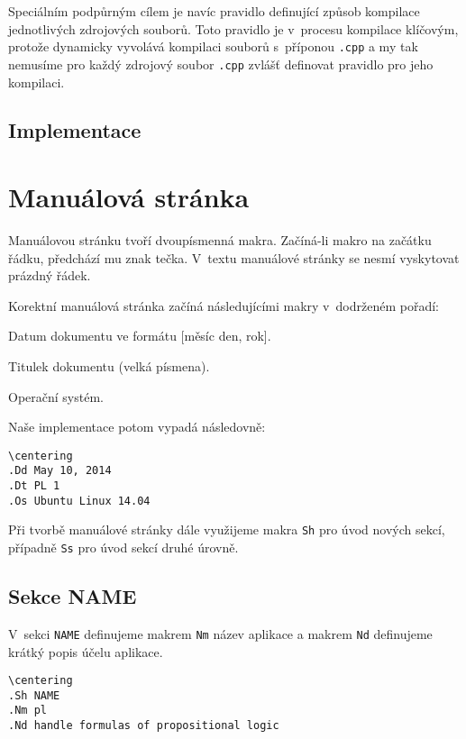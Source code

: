 \documentclass[thesis=B,czech,hidelinks]{FITthesis}[2012/06/26]
\begin{document}
Speciálním podpůrným cílem je navíc pravidlo definující způsob kompilace jednotlivých zdrojových souborů. Toto pravidlo je v~procesu kompilace klíčovým, protože dynamicky vyvolává kompilaci souborů s~příponou \texttt{.cpp} a my tak nemusíme pro každý zdrojový soubor \texttt{.cpp} zvlášť definovat pravidlo pro jeho kompilaci.

\subsection{Implementace}



\section{Manuálová stránka}

Manuálovou stránku tvoří dvoupísmenná makra. Začíná-li makro na začátku řádku, předchází mu znak tečka. V~textu manuálové stránky se nesmí vyskytovat prázdný řádek.

Korektní manuálová stránka začíná následujícími makry v~dodrženém pořadí:

\begin{description}
\centering
	\item[Dd] Datum dokumentu ve formátu [měsíc den, rok].
	\item[Dt] Titulek dokumentu (velká písmena).
	\item[Os] Operační systém.
\end{description}

Naše implementace potom vypadá následovně:

\begin{verbatim}
\centering
.Dd May 10, 2014
.Dt PL 1
.Os Ubuntu Linux 14.04
\end{verbatim}

Při tvorbě manuálové stránky dále využijeme makra \texttt{Sh} pro úvod nových sekcí, případně \texttt{Ss} pro úvod sekcí druhé úrovně.

\subsection{Sekce NAME}

V~sekci \texttt{NAME} definujeme makrem \texttt{Nm} název aplikace a makrem \texttt{Nd} definujeme krátký popis účelu aplikace.

\begin{verbatim}
\centering
.Sh NAME
.Nm pl
.Nd handle formulas of propositional logic
\end{verbatim}
\end{document}

